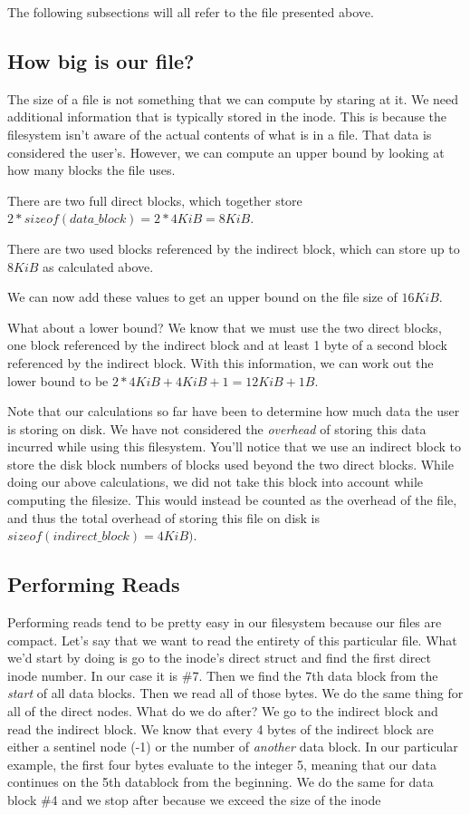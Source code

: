 The following subsections will all refer to the file presented above.

\subsection{How big is our file?}
The size of a file is not something that we can compute by staring at it. We need additional information that is
typically stored in the inode. This is because the filesystem isn't aware of the actual contents of what is in a file.
That data is considered the user's. However, we can compute an upper bound by looking at how many blocks the file uses.

There are two full direct blocks, which together store $2*sizeof(data\_block)=2*4KiB=8KiB$.

There are two used blocks referenced by the indirect block, which can store up to $8KiB$ as calculated above.

We can now add these values to get an upper bound on the file size of $16KiB$.

What about a lower bound? We know that we must use the two direct blocks, one block referenced by the indirect block and at least 1 byte of a
second block referenced by the indirect block. With this information, we can work out the lower bound to be $2*4KiB+4KiB+1=12KiB+1B$.

Note that our calculations so far have been to determine how much data the user is storing on disk. We have not
considered the \textit{overhead} of storing this data incurred while using this filesystem. You'll notice that we use an
indirect block to store the disk block numbers of blocks used beyond the two direct blocks. While doing our above
calculations, we did not take this block into account while computing the filesize. This would instead be counted as the
overhead of the file, and thus the total overhead of storing this file on disk is $sizeof(indirect\_block)=4KiB)$.

\subsection{Performing Reads}

Performing reads tend to be pretty easy in our filesystem because our files are compact. Let's say that we want to read
the entirety of this particular file. What we'd start by doing is go to the inode's direct struct and find the first
direct inode number. In our case it is \#7. Then we find the 7th data block from the \textit{start} of all data blocks.
Then we read all of those bytes.
We do the same thing for all of the direct nodes. What do we do after? We go to the indirect block and read the
indirect block. We know that every 4 bytes of the indirect block are either a sentinel node (-1) or the number of
\textit{another} data block. In our particular example, the first four bytes evaluate to the integer 5, meaning that
our data continues on the 5th datablock from the beginning. We do the same for data block \#4 and we stop after because
we exceed the size of the inode

